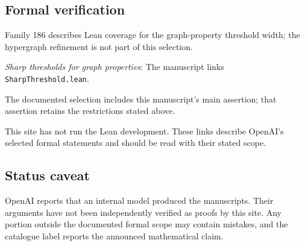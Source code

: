 \documentclass[11pt]{article}
\begin{document}
\subsection{Formal verification}
Family 186 describes Lean coverage for the graph-property threshold width; the hypergraph refinement is not part of this selection.

\textit{Sharp thresholds for graph properties}: The manuscript links \texttt{SharpThreshold.lean}.

The documented selection includes this manuscript’s main assertion; that assertion retains the restrictions stated above.

This site has not run the Lean development. These links describe OpenAI’s selected formal statements and should be read with their stated scope.

\subsection{Status caveat}
OpenAI reports that an internal model produced the manuscripts. Their arguments have not been independently verified as proofs by this site. Any portion outside the documented formal scope may contain mistakes, and the catalogue label reports the announced mathematical claim.
\end{document}
